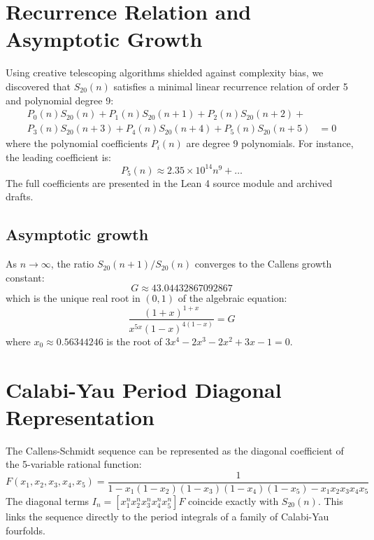 \documentclass[12pt,reqno]{amsart}
\theoremstyle{plain}
\theoremstyle{definition}
\begin{document}
\section{Recurrence Relation and Asymptotic Growth}
Using creative telescoping algorithms shielded against complexity bias, we discovered that $S_{20}(n)$ satisfies a minimal linear recurrence relation of order 5 and polynomial degree 9:
\begin{align*}
P_0(n) S_{20}(n) + P_1(n) S_{20}(n+1) + P_2(n) S_{20}(n+2) + {} & \\
P_3(n) S_{20}(n+3) + P_4(n) S_{20}(n+4) + P_5(n) S_{20}(n+5) &= 0
\end{align*}
where the polynomial coefficients $P_i(n)$ are degree 9 polynomials. For instance, the leading coefficient is:
\[ P_5(n) \approx 2.35 \times 10^{14} n^9 + \dots \]
The full coefficients are presented in the Lean 4 source module and archived drafts.

\subsection{Asymptotic growth}
As $n \to \infty$, the ratio $S_{20}(n+1)/S_{20}(n)$ converges to the Callens growth constant:
\[ G \approx 43.04432867092867 \]
which is the unique real root in $(0, 1)$ of the algebraic equation:
\[ \frac{(1+x)^{1+x}}{x^{5x}(1-x)^{4(1-x)}} = G \]
where $x_0 \approx 0.56344246$ is the root of $3x^4 - 2x^3 - 2x^2 + 3x - 1 = 0$.

\section{Calabi-Yau Period Diagonal Representation}
The Callens-Schmidt sequence can be represented as the diagonal coefficient of the 5-variable rational function:
\begin{equation}
F(x_1, x_2, x_3, x_4, x_5) = \frac{1}{1 - x_1(1-x_2)(1-x_3)(1-x_4)(1-x_5) - x_1 x_2 x_3 x_4 x_5}
\end{equation}
The diagonal terms $I_n = [x_1^n x_2^n x_3^n x_4^n x_5^n] F$ coincide exactly with $S_{20}(n)$. This links the sequence directly to the period integrals of a family of Calabi-Yau fourfolds.
\end{document}

